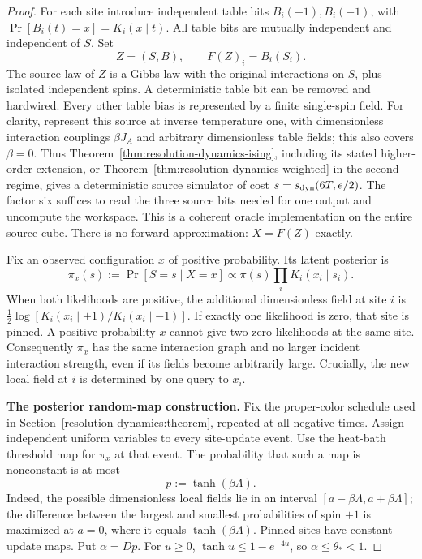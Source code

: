 \begin{proof}
For each site introduce independent table bits
\(B_i(+1),B_i(-1)\), with
\(\Pr[B_i(t)=x]=K_i(x\mid t)\). All table bits are mutually
independent and independent of \(S\). Set
\[
 Z=(S,B),\qquad F(Z)_i=B_i(S_i).
\]
The source law of \(Z\) is a Gibbs law with the original interactions
on \(S\), plus isolated independent spins. A deterministic table bit
can be removed and hardwired. Every other table bias is represented by
a finite single-spin field. For clarity, represent this source at
inverse temperature one, with dimensionless interaction couplings
\(\beta J_A\) and arbitrary dimensionless table fields; this also
covers \(\beta=0\). Thus
Theorem~\ref{thm:resolution-dynamics-ising}, including its stated
higher-order extension, or
Theorem~\ref{thm:resolution-dynamics-weighted} in the second regime,
gives a deterministic source simulator of cost
\(s=s_{\rm dyn}(6T,e/2)\). The factor six suffices to read the three
source bits needed for one output and uncompute the workspace.
This is a coherent oracle implementation on the entire source cube.
There is no forward approximation: \(X=F(Z)\) exactly.

Fix an observed configuration \(x\) of positive probability. Its
latent posterior is
\[
 \pi_x(s):=\Pr[S=s\mid X=x]
 \propto \pi(s)\prod_i K_i(x_i\mid s_i).
 \tag{LP}
\]
When both likelihoods are positive, the additional dimensionless
field at site \(i\) is
\(\frac12\log[K_i(x_i\mid+1)/K_i(x_i\mid-1)]\).
If exactly one likelihood is zero, that site is pinned. A positive
probability \(x\) cannot give two zero likelihoods at the same site.
Consequently \(\pi_x\) has the same interaction graph and no larger
incident interaction strength, even if its fields become arbitrarily
large. Crucially, the new local field at \(i\) is determined by
one query to \(x_i\).

\textbf{The posterior random-map construction.}
Fix the proper-color schedule used in
Section~\ref{resolution-dynamics:theorem}, repeated at all negative
times. Assign independent uniform variables to every site-update event.
Use the heat-bath threshold map for \(\pi_x\) at that event.
The probability that such a map is nonconstant is at most
\[
 p:=\tanh(\beta\Lambda).
 \tag{ACT}
\]
Indeed, the possible dimensionless local fields lie in an interval
\([a-\beta\Lambda,a+\beta\Lambda]\); the difference between the
largest and smallest probabilities of spin \(+1\) is maximized at
\(a=0\), where it equals \(\tanh(\beta\Lambda)\).
Pinned sites have constant update maps. Put \(\alpha=Dp\).
For \(u\ge0\), \(\tanh u\le1-e^{-4u}\), so
\(\alpha\le\theta_*<1\).


\end{proof}
